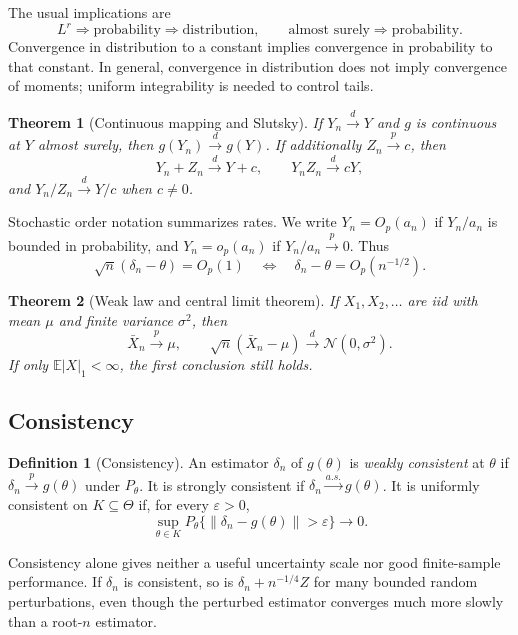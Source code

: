 \documentclass[12pt,oneside]{book}
\numberwithin{equation}{section}
\theoremstyle{definition}
\newtheorem{definition}{Definition}[section]
\theoremstyle{plain}
\newtheorem{theorem}{Theorem}[section]
\theoremstyle{remark}
\newcommand{\E}{\mathbb{E}}
\newcommand{\convd}{\overset{d}{\to}}
\newcommand{\convp}{\overset{p}{\to}}
\newcommand{\as}{\overset{a.s.}{\to}}
\newcommand{\norm}[1]{\left\lVert #1 \right\rVert}
\newcommand{\abs}[1]{\left\lvert #1 \right\rvert}
\newcommand{\Normal}{\mathcal{N}}
\begin{document}
The usual implications are
\[
    L^r\Longrightarrow\text{probability}\Longrightarrow\text{distribution},
    \qquad
    \text{almost surely}\Longrightarrow\text{probability}.
\]
Convergence in distribution to a constant implies convergence in probability
to that constant.  In general, convergence in distribution does not imply
convergence of moments; uniform integrability is needed to control tails.

\begin{theorem}[Continuous mapping and Slutsky]
If $Y_n\convd Y$ and $g$ is continuous at $Y$ almost surely, then
$g(Y_n)\convd g(Y)$.  If additionally $Z_n\convp c$, then
\[
    Y_n+Z_n\convd Y+c,
    \qquad Y_nZ_n\convd cY,
\]
and $Y_n/Z_n\convd Y/c$ when $c\neq0$.
\end{theorem}

Stochastic order notation summarizes rates.  We write $Y_n=O_p(a_n)$ if
$Y_n/a_n$ is bounded in probability, and $Y_n=o_p(a_n)$ if
$Y_n/a_n\convp0$.  Thus
\[
    \sqrt n(\delta_n-\theta)=O_p(1)
    \quad\Longleftrightarrow\quad
    \delta_n-\theta=O_p(n^{-1/2}).
\]

\begin{theorem}[Weak law and central limit theorem]
If $X_1,X_2,\ldots$ are iid with mean $\mu$ and finite variance
$\sigma^2$, then
\[
    \bar X_n\convp\mu,
    \qquad
    \sqrt n(\bar X_n-\mu)\convd\Normal(0,\sigma^2).
\]
If only $\E\abs X_1<\infty$, the first conclusion still holds.
\end{theorem}

\subsection{Consistency}

\begin{definition}[Consistency]
An estimator $\delta_n$ of $g(\theta)$ is \emph{weakly consistent} at
$\theta$ if $\delta_n\convp g(\theta)$ under $P_\theta$.  It is strongly
consistent if $\delta_n\as g(\theta)$.  It is uniformly consistent on
$K\subseteq\Theta$ if, for every $\varepsilon>0$,
\[
    \sup_{\theta\in K}
    P_\theta\{\norm{\delta_n-g(\theta)}>\varepsilon\}\longrightarrow0.
\]
\end{definition}

Consistency alone gives neither a useful uncertainty scale nor good
finite-sample performance.  If $\delta_n$ is consistent, so is
$\delta_n+n^{-1/4}Z$ for many bounded random perturbations, even though the
perturbed estimator converges much more slowly than a root-$n$ estimator.
\end{document}
